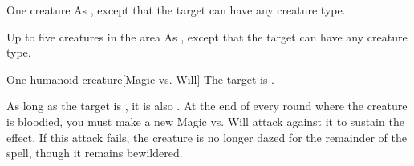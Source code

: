 \begin{spellheader}
    \spellrng{\rngclose}
\end{spellheader}
\begin{spelleffects}
    \begin{spelltarget}{One creature}
        \spellsuccess As , except that the target can have any creature type.
    \end{spelltarget}
\end{spelleffects}
\begin{spellfooter}
    
\end{spellfooter}

\begin{spellheader}
\end{spellheader}
\begin{spelleffects}
    \begin{spelltargets}{Up to five creatures in the area}
        \spellsuccess As , except that the target can have any creature type.
    \end{spelltargets}
\end{spelleffects}
\begin{spellfooter}
    
\end{spellfooter}

\begin{spellheader}
    \spellrng{\rngclose}
\end{spellheader}
\begin{spelleffects}
    \begin{spelltarget}{One humanoid creature}[Magic vs. Will]
        \spellsuccess The target is \bewildered.

        As long as the target is \bloodied, it is also \dazed. At the end of every round where the creature is bloodied, you must make a new Magic vs. Will attack against it to sustain the effect. If this attack fails, the creature is no longer dazed for the remainder of the spell, though it remains bewildered.
    \end{spelltarget}
\end{spelleffects}
\begin{spellfooter}
    
\end{spellfooter}

